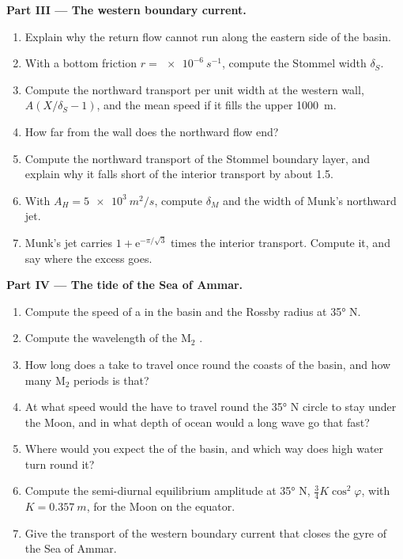 \begin{problem}
\medskip\noindent\textbf{Part III --- The western boundary current.}
\begin{enumerate}[resume]
\item Explain why the return flow cannot run along the eastern side of the
  basin.
\item With a bottom friction $r = \qty{e-6}{s^{-1}}$, compute the Stommel
  width $\delta_S$.
\item Compute the northward transport per unit width at the western wall,
  $A(X/\delta_S - 1)$, and the mean speed if it fills the upper
  \qty{1000}{m}.
\item How far from the wall does the northward flow end?
\item Compute the northward transport of the Stommel boundary layer, and
  explain why it falls short of the interior transport by about
  \qty{1.5}{\sverdrup}.
\item With $A_H = \qty{5e3}{m^2/s}$, compute $\delta_M$ and the width of
  Munk's northward jet.
\item Munk's jet carries $1 + \mathrm e^{-\pi/\sqrt3}$ times the interior
  transport. Compute it, and say where the excess goes.
\end{enumerate}

\medskip\noindent\textbf{Part IV --- The tide of the Sea of Ammar.}
\begin{enumerate}[resume]
\item Compute the speed of a  in the basin and the Rossby radius
  at \ang{35} N.
\item Compute the wavelength of the M$_2$ .
\item How long does a  take to travel once round the coasts of
  the basin, and how many M$_2$ periods is that?
\item At what speed would the  have to travel round the
  \ang{35} N circle to stay under the Moon, and in what depth of ocean
  would a long wave go that fast?
\item Where would you expect the  of the basin, and which
  way does high water turn round it?
\item Compute the semi-diurnal equilibrium amplitude at \ang{35} N, $\tfrac34
  K\cos^2\varphi$, with $K = \qty{0.357}{m}$, for the Moon on the equator.
\item Give the transport of the western boundary current that closes the
  gyre of the Sea of Ammar.
\end{enumerate}
\end{problem}
